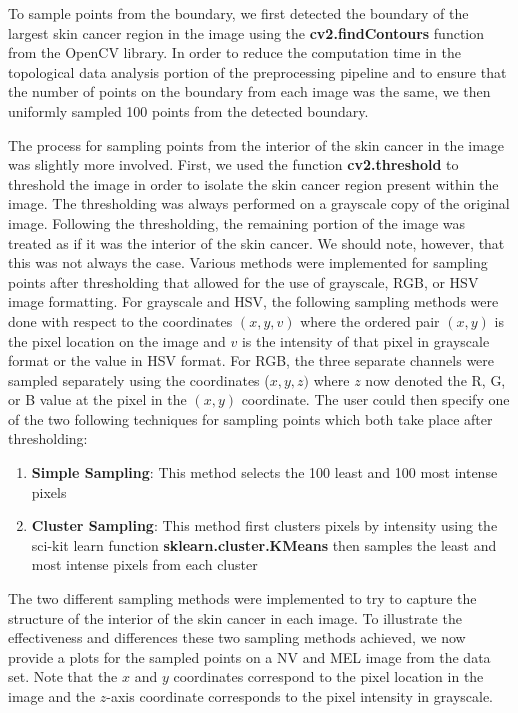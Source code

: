 \documentclass[11pt, reqno]{amsart}
\theoremstyle{plain}
\theoremstyle{definition}
\begin{document}
To sample points from the boundary, we first detected the boundary of the largest skin cancer region in the image using the {\bfseries cv2.findContours} function from the OpenCV library. In order to reduce the computation time in the topological data analysis portion of the preprocessing pipeline and to ensure that the number of points on the boundary from each image was the same, we then uniformly sampled 100 points from the detected boundary. 

The process for sampling points from the interior of the skin cancer in the image was slightly more involved. First, we used the function {\bfseries cv2.threshold} to threshold the image in order to isolate the skin cancer region present within the image. The thresholding was always performed on a grayscale copy of the original image. Following the thresholding, the remaining portion of the image was treated as if it was the interior of the skin cancer. We should note, however, that this was not always the case. Various methods were implemented for sampling points after thresholding that allowed for the use of grayscale, RGB, or HSV image formatting. For grayscale and HSV, the following sampling methods were done with respect to the coordinates $(x,y,v)$ where the ordered pair $(x,y)$ is the pixel location on the image and $v$ is the intensity of that pixel in grayscale format or the value in HSV format. For RGB, the three separate channels were sampled separately using the coordinates ($x,y,z)$ where $z$ now denoted the R, G, or B value at the pixel in the $(x,y)$ coordinate. The user could then specify one of the two following techniques for sampling points which both take place after thresholding:
\begin{enumerate}
    \item {\bfseries Simple Sampling}: This method selects the 100 least and 100 most intense pixels
    \item {\bfseries Cluster Sampling}: This method first clusters pixels by intensity using the sci-kit learn function {\bfseries sklearn.cluster.KMeans} then samples the least and most intense pixels from each cluster
\end{enumerate}
The two different sampling methods were implemented to try to capture the structure of the interior of the skin cancer in each image. To illustrate the effectiveness and differences these two sampling methods achieved, we now provide a plots for the sampled points on a NV and MEL image from the data set. Note that the $x$ and $y$ coordinates correspond to the pixel location in the image and the $z$-axis coordinate corresponds to the pixel intensity in grayscale. 
\end{document}
